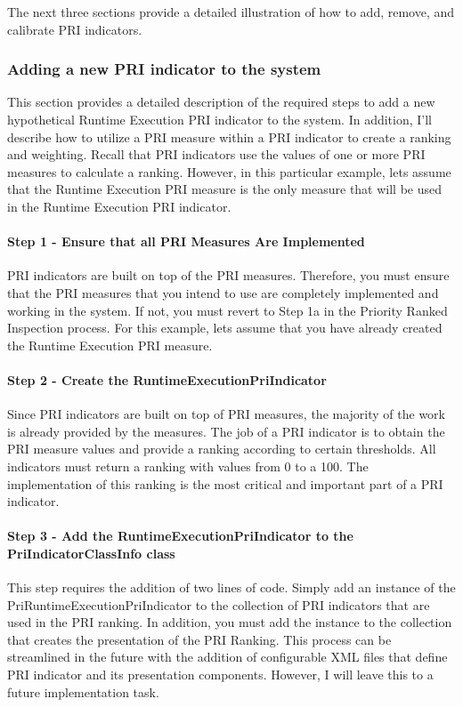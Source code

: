 The next three sections provide a detailed illustration of how to add,
remove, and calibrate PRI indicators.

\subsubsection{Adding a new PRI indicator to the system}
This section provides a detailed description of the required steps to add a
new hypothetical Runtime Execution PRI indicator to the system. In
addition, I'll describe how to utilize a PRI measure within a PRI indicator
to create a ranking and weighting. Recall that PRI indicators use the
values of one or more PRI measures to calculate a ranking. However, in this
particular example, lets assume that the Runtime Execution PRI measure is
the only measure that will be used in the Runtime Execution PRI indicator.

\paragraph{Step 1 - Ensure that all PRI Measures Are Implemented} 
PRI indicators are built on top of the PRI measures. Therefore, you must
ensure that the PRI measures that you intend to use are completely
implemented and working in the system. If not, you must revert to Step 1a
in the Priority Ranked Inspection process. For this example, lets assume
that you have already created the Runtime Execution PRI measure. 

\paragraph{Step 2 - Create the RuntimeExecutionPriIndicator} 
Since PRI indicators are built on top of PRI measures, the majority of the
work is already provided by the measures. The job of a PRI indicator is to
obtain the PRI measure values and provide a ranking according to certain
thresholds. All indicators must return a ranking with values from 0 to a
100. The implementation of this ranking is the most critical and important
part of a PRI indicator.

\paragraph{Step 3 - Add the RuntimeExecutionPriIndicator to the
  PriIndicatorClassInfo class} This step requires the addition of two lines
of code. Simply add an instance of the PriRuntimeExecutionPriIndicator to
the collection of PRI indicators that are used in the PRI ranking. In
addition, you must add the instance to the collection that creates the
presentation of the PRI Ranking. This process can be streamlined in the
future with the addition of configurable XML files that define PRI
indicator and its presentation components. However, I will leave this to a
future implementation task.

